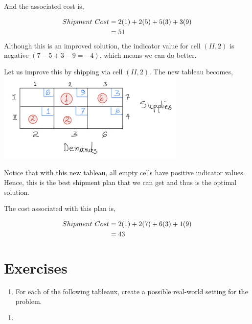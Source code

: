 \documentclass[
  letterpaper,
  DIV=11,
  numbers=noendperiod]{scrreprt}
\providecommand{\tightlist}{%
  \setlength{\itemsep}{0pt}\setlength{\parskip}{0pt}}\usepackage{longtable,booktabs,array}
\begin{document}
And the associated cost is,

\[
\begin{aligned}
Shipment \hspace{.05in}Cost
&=2(1)+2(5)+5(3)+3(9)\\
&=51
\end{aligned}
\] Although this is an improved solution, the indicator value for cell
\((II,2)\) is negative \((7-5+3-9=-4)\), which means we can do better.

Let us improve this by shipping via cell \((II,2)\). The new tableau
becomes,
\includegraphics[width=0.7\textwidth,height=\textheight]{images/r.jpeg}

Notice that with this new tableau, all empty cells have positive
indicator values. Hence, this is the best shipment plan that we can get
and thus is the optimal solution.

The cost associated with this plan is,

\[
\begin{aligned}
Shipment \hspace{.05in}Cost
&=2(1)+2(7)+6(3)+1(9)\\
&=43
\end{aligned}
\]

\hypertarget{exercises-4}{%
\section{Exercises}\label{exercises-4}}

\begin{enumerate}
\def\labelenumi{\arabic{enumi}.}
\tightlist
\item
  For each of the following tableaux, create a possible real-world
  setting for the problem.
\end{enumerate}

\begin{enumerate}
\def\labelenumi{\alph{enumi})}
\tightlist
\item
\end{enumerate}
\end{document}
